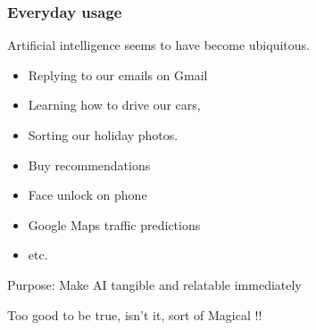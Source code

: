 
\begin{frame}[fragile]\frametitle{Everyday usage}
Artificial intelligence seems to have become ubiquitous.
\begin{itemize}
\item Replying to our emails on Gmail
\item Learning how to drive our cars,
\item Sorting our holiday photos.
\item Buy recommendations
\item Face unlock on phone
\item Google Maps traffic predictions
\item etc.
\end{itemize}
Purpose: Make AI tangible and relatable immediately



Too good to be true, isn't it, sort of Magical !!
\end{frame}







